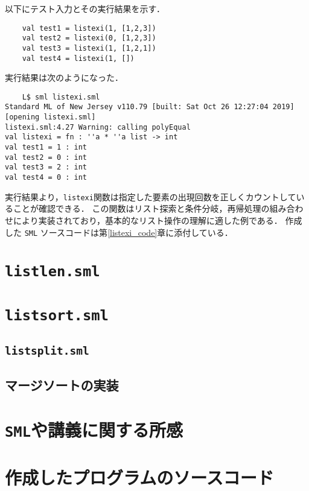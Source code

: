 \documentclass[autodetect-engine,dvi=dvipdfmx,ja=standard,
               a4j,11pt]{bxjsarticle}
\begin{document}
以下にテスト入力とその実行結果を示す．
\begin{Verbatim}
    val test1 = listexi(1, [1,2,3])
    val test2 = listexi(0, [1,2,3])
    val test3 = listexi(1, [1,2,1])
    val test4 = listexi(1, [])    
\end{Verbatim}
実行結果は次のようになった．
\begin{Verbatim}
    L$ sml listexi.sml 
Standard ML of New Jersey v110.79 [built: Sat Oct 26 12:27:04 2019]
[opening listexi.sml]
listexi.sml:4.27 Warning: calling polyEqual
val listexi = fn : ''a * ''a list -> int
val test1 = 1 : int
val test2 = 0 : int
val test3 = 2 : int
val test4 = 0 : int
\end{Verbatim}
実行結果より，\texttt{listexi}関数は指定した要素の出現回数を正しくカウントしていることが確認できる．
この関数はリスト探索と条件分岐，再帰処理の組み合わせにより実装されており，基本的なリスト操作の理解に適した例である．
作成した \texttt{SML} ソースコードは第\ref{listexi_code}章に添付している．
\section{\texttt{listlen.sml}}
\section{\texttt{listsort.sml}}
\subsection{\texttt{listsplit.sml}}
\subsection{マージソートの実装}
\section{\texttt{SML}や講義に関する所感}

\section{作成したプログラムのソースコード} \label{code}
\end{document}
